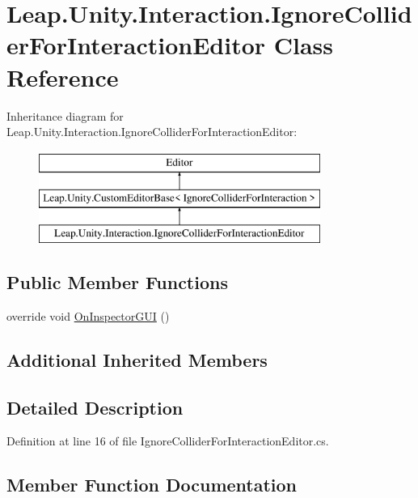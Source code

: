 \hypertarget{class_leap_1_1_unity_1_1_interaction_1_1_ignore_collider_for_interaction_editor}{}\section{Leap.\+Unity.\+Interaction.\+Ignore\+Collider\+For\+Interaction\+Editor Class Reference}
\label{class_leap_1_1_unity_1_1_interaction_1_1_ignore_collider_for_interaction_editor}
Inheritance diagram for Leap.\+Unity.\+Interaction.\+Ignore\+Collider\+For\+Interaction\+Editor\+:\begin{figure}[H]
\begin{center}
\leavevmode
\includegraphics[height=3.000000cm]{class_leap_1_1_unity_1_1_interaction_1_1_ignore_collider_for_interaction_editor}
\end{center}
\end{figure}
\subsection*{Public Member Functions}
\begin{DoxyCompactItemize}
\item 
override void \mbox{\hyperlink{class_leap_1_1_unity_1_1_interaction_1_1_ignore_collider_for_interaction_editor_ae3f83f5208f51c6b5805d449515c19c7}{On\+Inspector\+G\+UI}} ()
\end{DoxyCompactItemize}
\subsection*{Additional Inherited Members}


\subsection{Detailed Description}


Definition at line 16 of file Ignore\+Collider\+For\+Interaction\+Editor.\+cs.



\subsection{Member Function Documentation}
\mbox{\label{class_leap_1_1_unity_1_1_interaction_1_1_ignore_collider_for_interaction_editor_ae3f83f5208f51c6b5805d449515c19c7}} 
